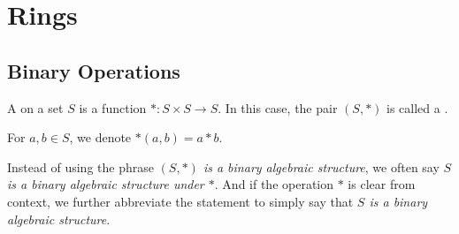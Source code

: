 \documentclass[11pt,fleqn,dvipsnames,usenames]{article}
\renewcommand{\headrulewidth}{1pt}
\newcommand{\p}{\noindent}
\begin{document}
\fancyhead[L]{\course}
\fancyhead[R]{\term}
\renewcommand{\headrulewidth}{0.4pt}


\setcounter{section}{3}
\section{Rings}
\setcounter{subsection}{0}
\subsection{Binary Operations}

\begin{definition}
A  on a set $S$ is a function $*:S\times S\to S$.  In this case, the pair $(S,*)$ is called a .
\end{definition}
\vsp

\notation For $a,b\in S$, we denote $*(a,b) = a * b$.
\vsp

\p Instead of using the phrase \emph{$(S,*)$ is a binary algebraic structure}, we often say \emph{$S$ is a binary algebraic structure under $*$}.  And if the operation $*$ is clear from context, we further abbreviate the statement to simply say that \emph{$S$ is a binary algebraic structure}.
\vsp
\end{document}
